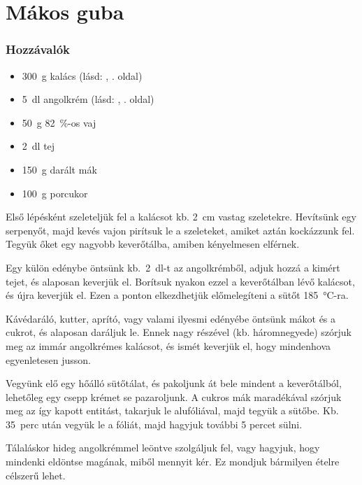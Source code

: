\newpage
\section{Mákos guba} \label{sec:makos_guba}

\subsubsection*{Hozzávalók}
\begin{itemize}
    \item \qty{300}{\g} kalács (lásd: , \pageref{sec:kalacs}. oldal)
    \item \qty{5}{\deci\l} angolkrém (lásd: , \pageref{sec:angolkrem}. oldal)
    \item \qty{50}{\g} \qty{82}{\percent}-os vaj
    \item \qty{2}{\deci\l} tej
    \item \qty{150}{\g} darált mák
    \item \qty{100}{\g} porcukor
\end{itemize}

Első lépésként szeleteljük fel a kalácsot kb. \qty{2}{\cm} vastag szeletekre. Hevítsünk egy serpenyőt, majd kevés vajon pirítsuk le a szeleteket, amiket aztán kockázzunk fel. Tegyük őket egy nagyobb keverőtálba, amiben kényelmesen elférnek.

Egy külön edénybe öntsünk kb.~\qty{2}{\deci\l}-t az angolkrémből, adjuk hozzá a kimért tejet, és alaposan keverjük el. Borítsuk nyakon ezzel a keverőtálban lévő kalácsot, és újra keverjük el. Ezen a ponton elkezdhetjük előmelegíteni a sütőt \qty{185}{\celsius}-ra.

Kávédaráló, kutter, aprító, vagy valami ilyesmi edényébe öntsünk mákot és a cukrot, és alaposan daráljuk le. Ennek nagy részével (kb. háromnegyede) szórjuk meg az immár angolkrémes kalácsot, és ismét keverjük el, hogy mindenhova egyenletesen jusson.

Vegyünk elő egy hőálló sütőtálat, és pakoljunk át bele mindent a keverőtálból, lehetőleg egy csepp krémet se pazaroljunk. A cukros mák maradékával szórjuk meg az így kapott entitást, takarjuk le alufóliával, majd tegyük a sütőbe. Kb. \num{35}~perc után vegyük le a fóliát, majd hagyjuk további \num{5} percet sülni.

Tálaláskor hideg angolkrémmel leöntve szolgáljuk fel, vagy hagyjuk, hogy mindenki eldöntse magának, miből mennyit kér. Ez mondjuk bármilyen ételre célszerű lehet.
